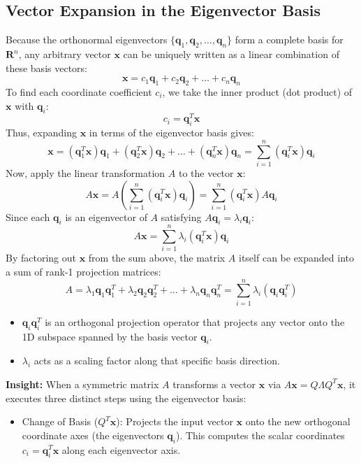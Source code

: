 \documentclass[DIV=20,oneside]{scrartcl}
\newcommand{\insight}[1]{%
	\begin{tcolorbox}[
		colback=black!20,
		colframe=black,
		boxrule=0.5pt,
		arc=2mm]
		\textbf{Insight: } #1
	\end{tcolorbox}
}
\begin{document}
\begin{itemize}
	\subsection{Vector Expansion in the Eigenvector Basis}
	Because the orthonormal eigenvectors $\{\mathbf{q}_1, \mathbf{q}_2, \dots, \mathbf{q}_n\}$ form a complete basis for $\mathbf{R}^n$, any arbitrary vector $\mathbf{x}$ can be uniquely written as a linear combination of these basis vectors:$$\mathbf{x} = c_1\mathbf{q}_1 + c_2\mathbf{q}_2 + \dots + c_n\mathbf{q}_n$$To find each coordinate coefficient $c_i$, we take the inner product (dot product) of $\mathbf{x}$ with $\mathbf{q}_i$:
	$$c_i = \mathbf{q}_i^T \mathbf{x}$$
	Thus, expanding $\mathbf{x}$ in terms of the eigenvector basis gives:$$\mathbf{x} = (\mathbf{q}_1^T \mathbf{x})\mathbf{q}_1 + (\mathbf{q}_2^T \mathbf{x})\mathbf{q}_2 + \dots + (\mathbf{q}_n^T \mathbf{x})\mathbf{q}_n = \sum_{i=1}^n (\mathbf{q}_i^T \mathbf{x})\mathbf{q}_i$$
	Now, apply the linear transformation $A$ to the vector $\mathbf{x}$:$$A\mathbf{x} = A \left( \sum_{i=1}^n (\mathbf{q}_i^T \mathbf{x})\mathbf{q}_i \right) = \sum_{i=1}^n (\mathbf{q}_i^T \mathbf{x}) A\mathbf{q}_i$$Since each $\mathbf{q}_i$ is an eigenvector of $A$ satisfying $A\mathbf{q}_i = \lambda_i \mathbf{q}_i$:$$A\mathbf{x} = \sum_{i=1}^n \lambda_i (\mathbf{q}_i^T \mathbf{x}) \mathbf{q}_i$$
	By factoring out $\mathbf{x}$ from the sum above, the matrix $A$ itself can be expanded into a sum of rank-1 projection matrices:$$A = \lambda_1 \mathbf{q}_1 \mathbf{q}_1^T + \lambda_2 \mathbf{q}_2 \mathbf{q}_2^T + \dots + \lambda_n \mathbf{q}_n \mathbf{q}_n^T = \sum_{i=1}^n \lambda_i (\mathbf{q}_i \mathbf{q}_i^T)$$
	\begin{itemize}
		\item $\mathbf{q}_i \mathbf{q}_i^T$ is an orthogonal projection operator that projects any vector onto the 1D subspace spanned by the basis vector $\mathbf{q}_i$.
		\item $\lambda_i$ acts as a scaling factor along that specific basis direction.
	\end{itemize}
	\insight{When a symmetric matrix $A$ transforms a vector $\mathbf{x}$ via $A\mathbf{x} = Q \Lambda Q^T \mathbf{x}$, it executes three distinct steps using the eigenvector basis:
		\begin{itemize}
			\item Change of Basis ($Q^T \mathbf{x}$): Projects the input vector $\mathbf{x}$ onto the new orthogonal coordinate axes (the eigenvectors $\mathbf{q}_i$). This computes the scalar coordinates $c_i = \mathbf{q}_i^T \mathbf{x}$ along each eigenvector axis.

\end{itemize}}
\end{itemize}
\end{document}
